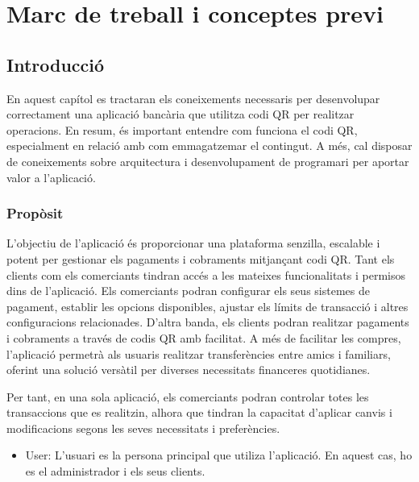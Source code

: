 \documentclass[a4paper,12pt,twoside]{ThesisStyle}
\begin{document}
\chapter{Marc de treball i conceptes previ}
\label{chp:marcdetreball}


\section{Introducció}
\label{subsec:Introducció}

En aquest capítol es tractaran els coneixements necessaris per desenvolupar correctament una aplicació bancària que utilitza codi QR per realitzar operacions. En resum, és important entendre com funciona el codi QR, especialment en relació amb com emmagatzemar el contingut. A més, cal disposar de coneixements sobre arquitectura i desenvolupament de programari per aportar valor a l'aplicació.

\subsection{Propòsit}
\label{subsubsec: Propòsit}

L'objectiu de l'aplicació és proporcionar una plataforma senzilla, escalable i potent per gestionar els pagaments i cobraments mitjançant codi QR. Tant els clients com els comerciants tindran accés a les mateixes funcionalitats i permisos dins de l'aplicació. Els comerciants podran configurar els seus sistemes de pagament, establir les opcions disponibles, ajustar els límits de transacció i altres configuracions relacionades. D'altra banda, els clients podran realitzar pagaments i cobraments a través de codis QR amb facilitat. A més de facilitar les compres, l'aplicació permetrà als usuaris realitzar transferències entre amics i familiars, oferint una solució versàtil per diverses necessitats financeres quotidianes.


Per tant, en una sola aplicació, els comerciants podran controlar totes les transaccions que es realitzin, alhora que tindran la capacitat d'aplicar canvis i modificacions segons les seves necessitats i preferències.



\begin{itemize}
  \item User: L'usuari es la persona principal que utiliza l'aplicació. En aquest cas, ho es el administrador i els seus clients.
\end{itemize}
\end{document}
